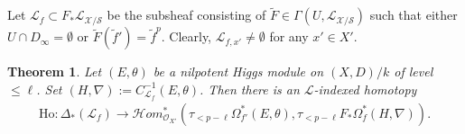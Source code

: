 \documentclass[12pt, a4paper]{article}
\newtheorem{theorem}{Theorem}[section]
\begin{document}
Let $\mathcal L_f\subset F_*\mathcal L_{\mathcal X/\mathcal S}$ be the subsheaf consisting of $\tilde F\in\Gamma(U,\mathcal L_{\mathcal X/\mathcal S})$ such that either $U\cap D_\infty=\emptyset$ or $\tilde F(\tilde f')=\tilde f^p$. Clearly, $\mathcal L_{f,x'}\neq\emptyset$ for any $x'\in X'$.
\begin{theorem}\label{infty homotopy f}
Let $(E,\theta)$ be a nilpotent Higgs module on $(X,D)/k$ of level $\leq\ell$. Set $(H,\nabla):=C^{-1}_{\mathcal L_f}(E,\theta)$. Then there is an $\mathcal L$-indexed homotopy 
\begin{eqnarray}\label{F_*L indexed homotopy f}
\mathrm{Ho}:\Delta_*(\mathcal L_f)\to\mathcal Hom^*_{\mathcal O_{X'}}(\tau_{<p-\ell}\Omega_{f'}^*(E,\theta),\tau_{<p-\ell}F_*\Omega_f^*(H,\nabla)).
\end{eqnarray}
\end{theorem}
\end{document}
